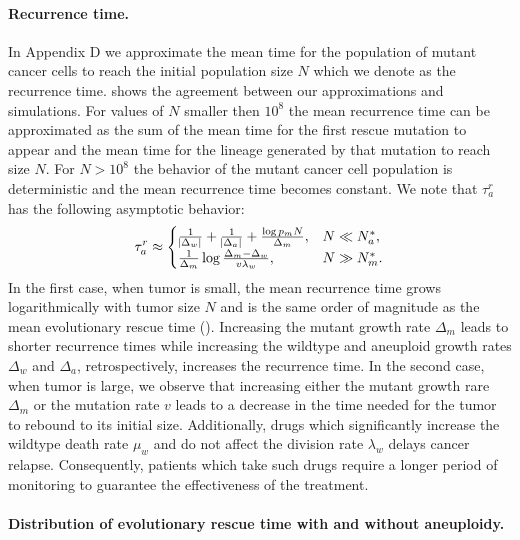 \documentclass[12pt]{extarticle}
\begin{document}
\paragraph{Recurrence time.} %

In Appendix D we approximate the mean time for the population of mutant cancer cells to reach the initial population size $N$ which we denote as the recurrence time.  shows the agreement between our approximations and simulations. For values of $N$ smaller then $10^8$ the mean recurrence time can be approximated as the sum of the mean time for the first rescue mutation to appear and the mean time for the lineage generated by that mutation to reach size $N$. For $N>10^8$ the behavior of the mutant cancer cell population is deterministic and the mean recurrence time becomes constant. We note that $\tau_a^r$ has the following asymptotic behavior:
\begin{equation} \label{eq:AsymptoticTimeRulesRecurrence}
\tau_a^r \approx \begin{cases}
   \frac{1}{ \abs{\Delta_w}}+\frac{1}{ \abs{\Delta_a}}+\frac{\log p_mN}{\Delta_m} ,&
 N \ll N_a^* ,\\ 
  \frac{1}{\Delta_m}\log\frac{\Delta_m-\Delta_w}{v\lambda_w}  ,&
  N \gg N_m^* .
  \end{cases}
\end{equation}
In the first case, when tumor is small, the mean recurrence time grows logarithmically with tumor size $N$ and is the same order of magnitude as the mean evolutionary rescue time (). Increasing the mutant growth rate $\Delta_m$ leads to shorter recurrence times while increasing the wildtype and aneuploid growth rates $\Delta_w$ and $\Delta_a$, retrospectively, increases the recurrence time. In the second case, when tumor is large, we observe that increasing either the mutant growth rare $\Delta_m$ or the mutation rate $v$ leads to a decrease in the time needed for the tumor to rebound to its initial size. Additionally, drugs which significantly increase the wildtype death rate $\mu_w$ and do not affect the division rate $\lambda_w$ delays cancer relapse. Consequently, patients which take such drugs require a longer period of monitoring to guarantee the effectiveness of the treatment. %
\paragraph{Distribution of evolutionary rescue time with and without aneuploidy.}
\end{document}
